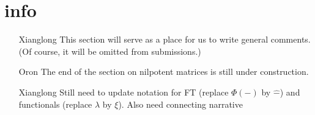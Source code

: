 \section*{info}
\begin{itemize}
	\item[Xianglong] This section will serve as a place for us to write general comments. (Of course, it will be omitted from submissions.)

    \item[Oron] The end of the section on nilpotent matrices is still under construction.
    
    \item[Xianglong] Still need to update notation for FT (replace $\Phi(-)$ by $\widehat{-}$) and functionals (replace $\lambda$ by $\xi$). Also need connecting narrative
\end{itemize}
\newpage
